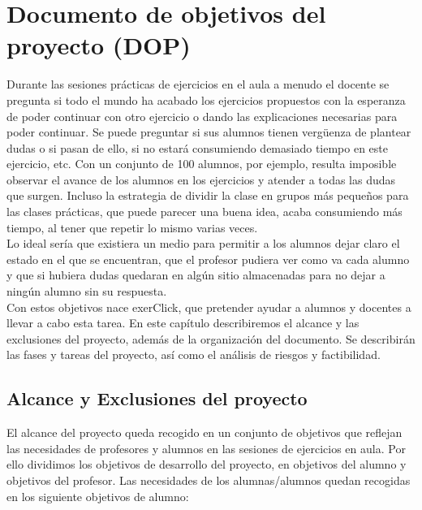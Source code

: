 
\pagestyle{fancy}

\chapter{Documento de objetivos del proyecto (DOP)}
\label{objetivos}

Durante las sesiones prácticas de ejercicios en el aula a menudo el docente se pregunta si todo el mundo ha acabado los ejercicios propuestos con la esperanza de poder continuar con otro ejercicio o dando las explicaciones necesarias para poder continuar. Se puede preguntar si sus alumnos tienen vergüenza de plantear dudas o si pasan de ello, si no estará consumiendo demasiado tiempo en este ejercicio, etc. Con un conjunto de 100 alumnos, por ejemplo, resulta imposible observar el avance de los alumnos en los ejercicios y atender a todas las dudas que surgen. Incluso la estrategia de dividir la clase en grupos más pequeños para las clases prácticas, que puede parecer una buena idea, acaba consumiendo más tiempo, al tener que repetir lo mismo varias veces.\\

Lo ideal sería que existiera un medio para permitir a los alumnos dejar claro el estado en el que se encuentran, que el profesor pudiera ver como va cada alumno y que si hubiera dudas quedaran en algún sitio almacenadas para no dejar a ningún alumno sin su respuesta.\\

Con estos objetivos nace exerClick, que pretender ayudar a alumnos y docentes a llevar a cabo esta tarea. En este capítulo describiremos el alcance y las exclusiones del proyecto, además de la organización del documento. Se describirán las fases y tareas del proyecto, así como el análisis de riesgos y factibilidad.\\


\section{Alcance y Exclusiones del proyecto}

El alcance del proyecto queda recogido en un conjunto de objetivos que reflejan las necesidades de profesores y alumnos en las sesiones de ejercicios en aula. Por ello dividimos los objetivos de desarrollo del proyecto, en objetivos del alumno y objetivos del profesor. Las necesidades de los alumnas/alumnos quedan recogidas en los siguiente objetivos de alumno:


